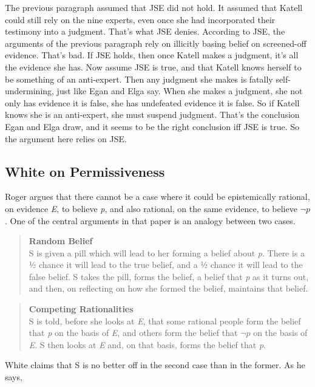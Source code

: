 The previous paragraph assumed that JSE did not hold. It assumed that \gls{Katell} could still rely on the nine experts, even once she had incorporated their testimony into a judgment. That's what JSE denies. According to JSE, the arguments of the previous paragraph rely on illicitly basing belief on screened-off evidence. That's bad. If JSE holds, then once \gls{Katell} makes a judgment, it's all the evidence she has. Now assume JSE is true, and that \gls{Katell} knows herself to be something of an anti-expert. Then any judgment she makes is fatally self-undermining, just like Egan and Elga say. When she makes a judgment, she not only has evidence it is false, she has undefeated evidence it is false. So if \gls{Katell} knows she is an anti-expert, she must suspend judgment. That's the conclusion Egan and Elga draw, and it seems to be the right conclusion iff JSE is true. So the argument here relies on JSE.

\subsection{White on Permissiveness}
\label{whiteonpermissiveness}

Roger \citet{White2005} argues that there cannot be a case where it could be epistemically rational, on evidence \emph{E}, to believe \emph{p}, and also rational, on the same evidence, to believe $\neg p$. One of the central arguments in that paper is an analogy between two cases.

\begin{quote}
\textbf{Random Belief}\\
S is given a pill which will lead to her forming a belief about \emph{p}. There is a ½ chance it will lead to the true belief, and a ½ chance it will lead to the false belief. S takes the pill, forms the belief, a belief that \emph{p} as it turns out, and then, on reflecting on how she formed the belief, maintains that belief.
\end{quote}
\begin{quote}
\textbf{Competing Rationalities}\\
S is told, before she looks at \emph{E}, that some rational people form the belief that \emph{p} on the basis of \emph{E}, and others form the belief that $\neg p$ on the basis of \emph{E}. S then looks at \emph{E} and, on that basis, forms the belief that \emph{p}.
\end{quote}
White claims that S is no better off in the second case than in the former. As he says,

